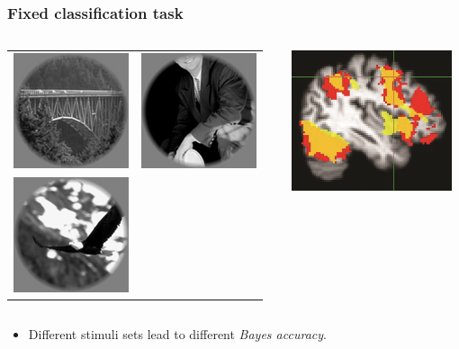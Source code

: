 \documentclass{beamer}
\begin{document}
{

}

\begin{frame}
\frametitle{Fixed classification task}
\begin{columns}
\begin{column}{0.6\textwidth}
\begin{tabular}{cc}
\includegraphics[scale = 0.5]{img1.png} &
\includegraphics[scale = 0.5]{img2.png} \\
\includegraphics[scale = 0.5]{img3.png} &
\end{tabular}
\end{column}
\begin{column}{0.4\textwidth}
\includegraphics[scale = 0.5]{smbrain1.png}
\end{column}
\end{columns}
\begin{itemize}
\item Different stimuli sets lead to different \emph{Bayes accuracy}.
\end{itemize}
\end{frame}
\end{document}
